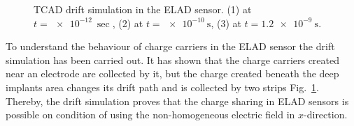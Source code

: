\begin{figure}[t]
\begin{minipage}[h]{0.24\linewidth}
 \end{minipage}
 \begin{minipage}[h]{0.24\linewidth}
 \end{minipage}
\caption[short description here]
  {TCAD drift simulation in the ELAD sensor. (1) at $t = \SI{e-12}{\sec}$, (2) at $t = \SI{e-10}{\s}$, (3) at $t = \SI{1.2e-9}{\s}$.}
\label{fig:drift}
\end{figure} %

To understand the behaviour of charge carriers in the ELAD sensor the drift simulation has been carried out. 
It has shown that the charge carriers created near an electrode are collected by it, but the charge created beneath the deep implants area
 changes its drift path and is collected by two strips Fig.~\ref{fig:drift}.  
Thereby, the drift simulation proves that the charge sharing in ELAD sensors is possible on condition of using the non-homogeneous electric field in $x$-direction. 


 